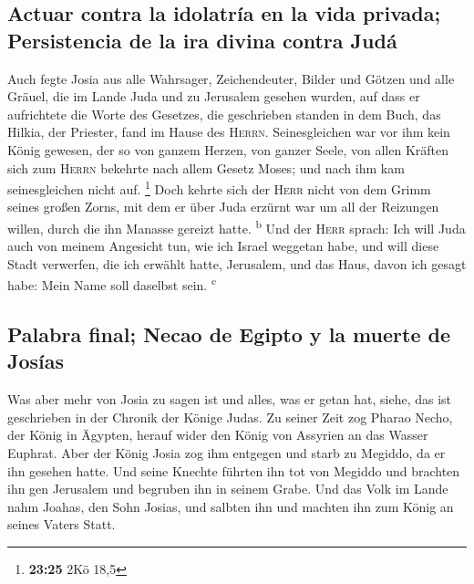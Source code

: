 \hypertarget{actuar-contra-la-idolatruxeda-en-la-vida-privada-persistencia-de-la-ira-divina-contra-juduxe1}{%
\subsection{Actuar contra la idolatría en la vida privada; Persistencia
de la ira divina contra
Judá}\label{actuar-contra-la-idolatruxeda-en-la-vida-privada-persistencia-de-la-ira-divina-contra-juduxe1}}

 Auch fegte Josia aus alle Wahrsager, Zeichendeuter,
Bilder und Götzen und alle Gräuel, die im Lande Juda und zu Jerusalem
gesehen wurden, auf dass er aufrichtete die Worte des Gesetzes, die
geschrieben standen in dem Buch, das Hilkia, der Priester, fand im Hause
des \textsc{Herrn}.  Seinesgleichen war vor ihm kein
König gewesen, der so von ganzem Herzen, von ganzer Seele, von allen
Kräften sich zum \textsc{Herrn} bekehrte nach allem Gesetz Moses; und
nach ihm kam seinesgleichen nicht auf. \footnote{\textbf{23:25} 2Kö 18,5}
 Doch kehrte sich der \textsc{Herr} nicht von dem Grimm
seines großen Zorns, mit dem er über Juda erzürnt war um all der
Reizungen willen, durch die ihn Manasse gereizt hatte.
\textsuperscript{b}  Und der \textsc{Herr} sprach: Ich
will Juda auch von meinem Angesicht tun, wie ich Israel weggetan habe,
und will diese Stadt verwerfen, die ich erwählt hatte, Jerusalem, und
das Haus, davon ich gesagt habe: Mein Name soll daselbst sein.
\textsuperscript{c}

\hypertarget{palabra-final-necao-de-egipto-y-la-muerte-de-josuxedas}{%
\subsection{Palabra final; Necao de Egipto y la muerte de
Josías}\label{palabra-final-necao-de-egipto-y-la-muerte-de-josuxedas}}

 Was aber mehr von Josia zu sagen ist und alles, was er
getan hat, siehe, das ist geschrieben in der Chronik der Könige Judas.
 Zu seiner Zeit zog Pharao Necho, der König in Ägypten,
herauf wider den König von Assyrien an das Wasser Euphrat. Aber der
König Josia zog ihm entgegen und starb zu Megiddo, da er ihn gesehen
hatte.  Und seine Knechte führten ihn tot von Megiddo und
brachten ihn gen Jerusalem und begruben ihn in seinem Grabe. Und das
Volk im Lande nahm Joahas, den Sohn Josias, und salbten ihn und machten
ihn zum König an seines Vaters Statt.

